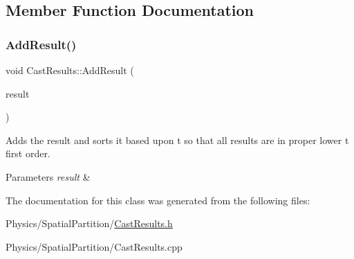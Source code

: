 \subsection{Member Function Documentation}
\mbox{\label{classCastResults_a62ee1ac3a8107eb7f8be4d991e9c47c5}} 
\subsubsection{\texorpdfstring{Add\+Result()}{AddResult()}}
{\footnotesize\ttfamily void Cast\+Results\+::\+Add\+Result (\begin{DoxyParamCaption}\item[{const \hyperlink{classCastResult}{Cast\+Result} \&}]{result }\end{DoxyParamCaption})}



Adds the result and sorts it based upon t so that all results are in proper lower t first order. 


\begin{DoxyParams}{Parameters}
{\em result} & \\
\hline
\end{DoxyParams}


The documentation for this class was generated from the following files\+:\begin{DoxyCompactItemize}
\item 
Physics/\+Spatial\+Partition/\hyperlink{CastResults_8h}{Cast\+Results.\+h}\item 
Physics/\+Spatial\+Partition/Cast\+Results.\+cpp\end{DoxyCompactItemize}
